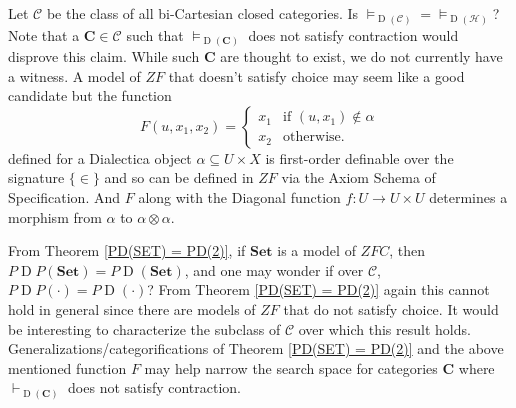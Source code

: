 \documentclass[reqno]{amsart}
\theoremstyle{plain}
\theoremstyle{definition}
\newcommand{\Set}{\mathbf{Set}}
\DeclareMathOperator{\D}{D}
\newcommand{\cf}[1]{\mathbf{#1}}
\begin{document}
Let $\mathcal{C} $ be the class of all bi-Cartesian closed categories. Is ${\vDash_{\D (\mathcal{C})}} = {\vDash_{\D (\mathcal{H})}} $? Note that a $\cf{C} \in \mathcal{C} $ such that $\vDash_{\D(\cf{C})}$ does not satisfy contraction would disprove this claim. While such $\cf{C} $ are thought to exist, we do not currently have a witness. A model of $ZF$ that doesn't satisfy choice may seem like a good candidate but the function
\begin{equation*}
    F(u,x_{1},x_{2}) =
\begin{cases}
	x_{1} & \text{if }(u,x_{1}) \notin \alpha \\
	x_{2} & \text{otherwise}.
\end{cases}
\end{equation*}
defined for a Dialectica object $\alpha \subseteq U \times X $ is first-order definable over the signature $\{\in \} $ and so can be defined in $ZF$ via the Axiom Schema of Specification. And $F$ along with the Diagonal function $ f \colon U \to U \times U$ determines a morphism from $\alpha$ to $\alpha \otimes \alpha $.

From Theorem \ref{PD(SET) = PD(2)}, if $\Set$ is a model of $ZFC$, then $P\D P(\Set) = P \D(\Set) $, and one may wonder if over $\mathcal{C} $, $P \D P (\cdot) = P \D (\cdot) $? From Theorem \ref{PD(SET) = PD(2)} again this cannot hold in general since there are models of $ZF$ that do not satisfy choice. It would be interesting to characterize the subclass of $\mathcal{C} $ over which this result holds. Generalizations/categorifications of Theorem \ref{PD(SET) = PD(2)} and the above mentioned function $F$ may help narrow the search space for categories $\mathbf{C}$ where $\vdash_{\D(\mathbf{C})}$ does not satisfy contraction.
\end{document}
